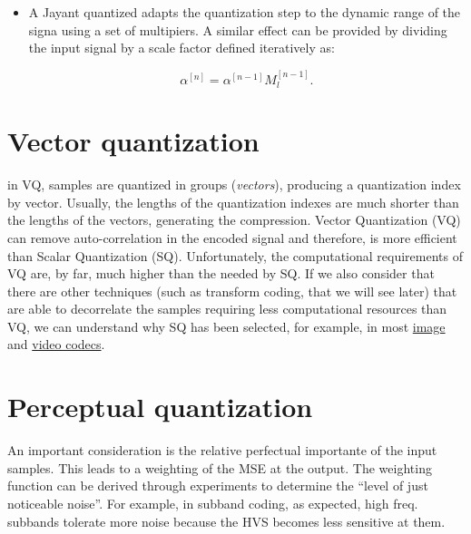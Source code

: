 \begin{itemize}
\item
  A Jayant quantized adapts the quantization step to the dynamic range
  of the signa using a set of multipiers. A similar effect can be
  provided by dividing the input signal by a scale factor defined
  iteratively as:

  \begin{equation}
    \alpha^{[n]} = \alpha^{[n-1]}M_l^{[n-1]}.
  \end{equation}
\end{itemize}


\section{Vector quantization}

in VQ, samples are quantized in groups (\emph{vectors}), producing a
quantization index by vector.  Usually, the lengths of the
quantization indexes are much shorter than the lengths of the vectors,
generating the compression. Vector Quantization (VQ) can remove
auto-correlation in the encoded signal and therefore, is more
efficient than Scalar Quantization (SQ). Unfortunately, the
computational requirements of VQ are, by far, much higher than the
needed by SQ. If we also consider that there are other techniques
(such as transform coding, that we will see later) that are able to
decorrelate the samples requiring less computational resources than
VQ, we can understand why SQ has been selected, for example, in most
\href{https://en.wikipedia.org/wiki/Image_compression}{image} and
\href{https://en.wikipedia.org/wiki/Video_coding_format}{video
  codecs}.


\section{Perceptual quantization}

An important consideration is the relative perfectual importante of
the input samples. This leads to a weighting of the MSE at the
output. The weighting function can be derived through experiments to
determine the ``level of just noticeable noise''. For example, in
subband coding, as expected, high freq. subbands tolerate more noise
because the HVS becomes less sensitive at them.


\section{}


